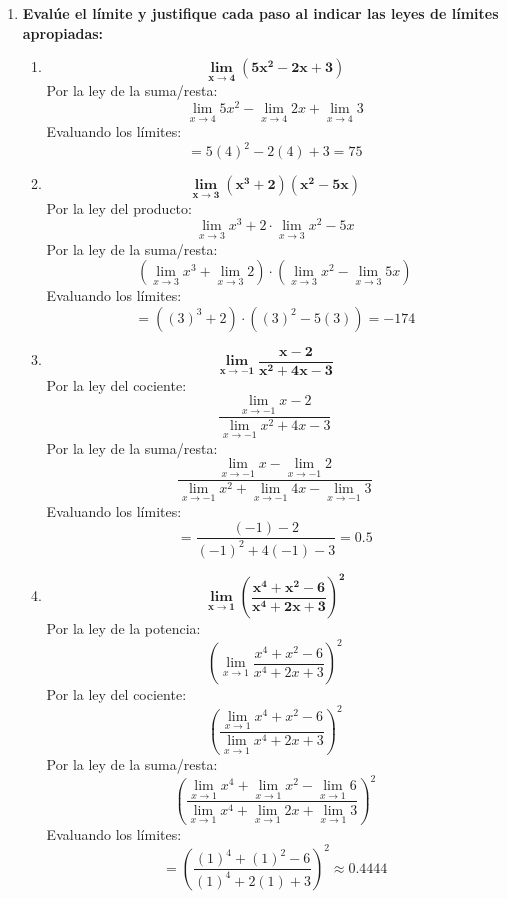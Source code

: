 \documentclass[12pt]{article}
\begin{document}
\begin{enumerate}[label=\textbf{\arabic*.}]
            
            \vspace{1cm}\hrule
            \item \textbf{Evalúe el límite y justifique cada paso al indicar las leyes de límites apropiadas:}
                \begin{enumerate}[label=\textbf{\arabic*)}] 
                    \item \[\bm{\lim_{x \to 4} (5x ^2 - 2x + 3)}\] Por la ley de la suma/resta: \[\lim_{x \to 4} 5x^2 - \lim_{x \to 4} 2x + \lim_{x \to 4} 3\] Evaluando los límites: \[= 5(4)^2 - 2(4) + 3 = 75\]
                    \item \[\bm{\lim_{x \to 3} (x ^3 + 2)(x ^2 - 5x)}\] Por la ley del producto: \[\lim_{x \to 3} x ^3 + 2 \cdot \lim_{x \to 3} x ^2 - 5x \] Por la ley de la suma/resta: \[\left(\lim_{x \to 3} x^3 + \lim_{x \to 3} 2\right) \cdot \left(\lim_{x \to 3} x^2 - \lim_{x \to 3} 5x\right)\] Evaluando los límites: \[= ((3)^3 + 2) \cdot ((3)^2 - 5(3)) = -174\]
                    \item \[\bm{\lim_{x \to -1} \frac{x - 2 }{x ^2 + 4x - 3}}\] Por la ley del cociente: \[\frac{\lim_{x \to -1} x - 2}{\lim_{x \to -1} x ^2 + 4x - 3}\] Por la ley de la suma/resta: \[\frac{\lim_{x \to -1} x - \lim_{x \to -1}2}{\lim_{x \to -1} x ^2 + \lim_{x \to -1} 4x - \lim_{x \to -1} 3}\] Evaluando los límites: \[= \frac{(-1) - 2}{(-1)^2 + 4(-1) - 3} = 0.5\]
                    \item \[\bm{\lim_{x \to 1} \left(\frac{x^4 + x^2 - 6}{x^4 + 2x + 3}\right)^2}\] Por la ley de la potencia: \[\left(\lim_{x \to 1} \frac{x^4 + x^2 - 6}{x^4 + 2x + 3}\right)^2\] Por la ley del cociente: \[\left(\frac{\lim_{x \to 1} x^4 + x^2 - 6}{\lim_{x \to 1}  x^4 + 2x + 3}\right)^2\] Por la ley de la suma/resta: \[\left(\frac{\lim_{x \to 1} x^4 + \lim_{x \to 1} x^2 - \lim_{x \to 1} 6}{\lim_{x \to 1}  x^4 + \lim_{x \to 1} 2x + \lim_{x \to 1} 3}\right)^2\] Evaluando los límites: \[= \left(\frac{(1)^4 + (1)^2 - 6}{(1)^4 + 2(1) + 3}\right)^2 \approx 0.4444\]
                \end{enumerate}


\end{enumerate}
\end{document}
